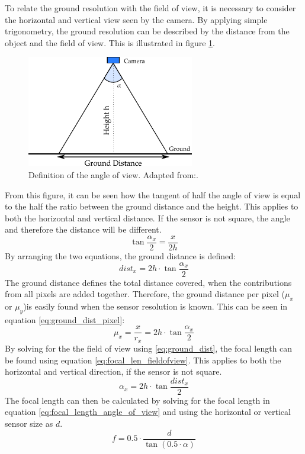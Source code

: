To relate the ground resolution with the field of view, it is necessary to consider the horizontal and vertical view seen by the camera. By applying simple trigonometry, the ground resolution can be described by the distance from the object and the field of view. This is illustrated in figure \ref{fig:angle_of_view_def}.
\begin{figure}[htb]
\centering
\includegraphics[width=0.65\textwidth]{figures/Orbiter/imaging_angle_of_view}
\caption{Definition of the angle of view. Adapted from:\cite{dsil2014}.}
\label{fig:angle_of_view_def}
\end{figure}
From this figure, it can be seen how the tangent of half the angle of view is equal to the half the ratio between the ground distance and the height. This applies to both the horizontal and vertical distance. If the sensor is not square, the angle and therefore the distance will be different.
\begin{equation}
\label{eq:angle_of_view}
\tan{\frac{\alpha_x}{2}} = \frac{x}{2h}
\end{equation}
By arranging the two equations, the ground distance is defined:
\begin{equation}
\label{eq:ground_dist}
dist_x = 2h\cdot \tan{\frac{\alpha_x}{2}}
\end{equation}
The ground distance defines the total distance covered, when the contributions from all pixels are added together. Therefore, the ground distance per pixel ($\mu_x$ or $\mu_y$)is easily found when the sensor resolution is known. This can be seen in equation \eqref{eq:ground_dist_pixel}:
\begin{equation}
\label{eq:ground_dist_pixel}
\mu_x = \frac{x}{r_x} = 2h\cdot \tan{\frac{\alpha_x}{2}}
\end{equation}
By solving for the the field of view using \eqref{eq:ground_dist}, the focal length can be found using equation \eqref{eq:focal_len_fieldofview}. This applies to both the horizontal and vertical direction, if the sensor is not square.
\begin{equation}
\label{eq:angle_of_view_ground_dist}
\alpha_x = 2h\cdot \tan{\frac{dist_x}{2}}
\end{equation}
The focal length can then be calculated by solving for the focal length in equation \eqref{eq:focal_length_angle_of_view} and using the horizontal or vertical sensor size as $d$.
\begin{equation}
\label{eq:focal_length_angle_of_view}
f = 0.5\cdot\frac{d}{\tan{\left(0.5\cdot \alpha\right)}}
\end{equation}
